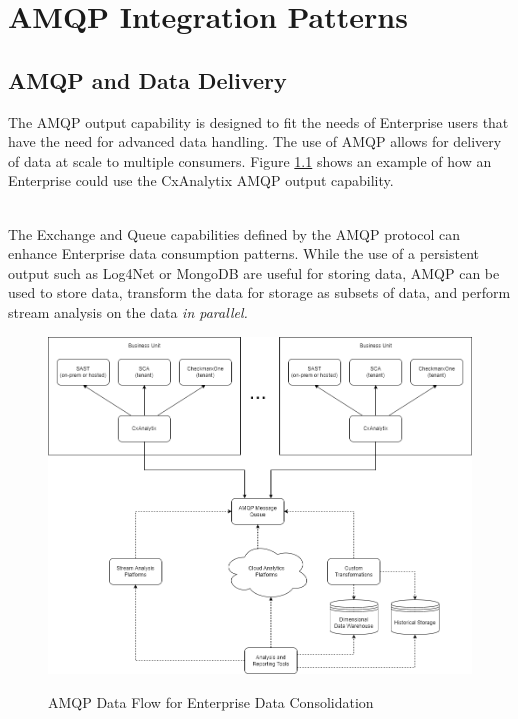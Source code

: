 \chapter{AMQP Integration Patterns}\label{chap:amqp_patterns}



\section{AMQP and Data Delivery}
The AMQP output capability is designed to fit the needs of Enterprise users that have the need for advanced data handling.  The use of AMQP allows
for delivery of data at scale to multiple consumers.  Figure \ref{fig:AMQP-data-flows} shows an example of how an Enterprise could use the
CxAnalytix AMQP output capability.

\noindent\\The Exchange and Queue capabilities defined by the AMQP protocol can enhance Enterprise data consumption patterns.  While the use
of a persistent output such as Log4Net or MongoDB are useful for storing data, AMQP can be used to store data, transform the data for storage
as subsets of data, and perform stream analysis on the data \textit{in parallel.}  

\begin{figure}[h]
    \caption{AMQP Data Flow for Enterprise Data Consolidation}
    \includegraphics[width=\textwidth]{graphics/AMQP-data-org.png}
    \label{fig:AMQP-data-flows}
\end{figure}



